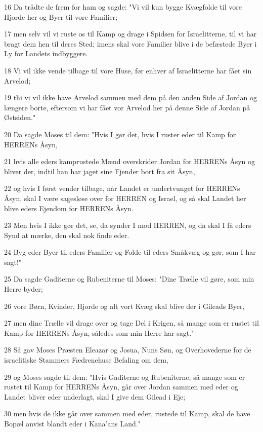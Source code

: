 \par 16 Da trådte de frem for ham og sagde: "Vi vil kun bygge Kvægfolde til vore Hjorde her og Byer til vore Familier;
\par 17 men selv vil vi ruste os til Kamp og drage i Spidsen for Israelitterne, til vi har bragt dem hen til deres Sted; imens skal vore Familier blive i de befæstede Byer i Ly for Landets indbyggere.
\par 18 Vi vil ikke vende tilbage til vore Huse, før enhver af Israelitterne har fået sin Arvelod;
\par 19 thi vi vil ikke have Arvelod sammen med dem på den anden Side af Jordan og længere borte, eftersom vi har fået vor Arvelod her på denne Side af Jordan på Østsiden."
\par 20 Da sagde Moses til dem: "Hvis I gør det, hvis I ruster eder til Kamp for HERRENs Åsyn,
\par 21 hvis alle eders kamprustede Mænd overskrider Jordan for HERRENs Åsyn og bliver der, indtil han har jaget sine Fjender bort fra sit Åsyn,
\par 22 og hvis I først vender tilbage, når Landet er undertvunget for HERRENs Åsyn, skal I være sagesløse over for HERREN og Israel, og så skal Landet her blive eders Ejendom for HERRENs Åsyn.
\par 23 Men hvis I ikke gør det, se, da synder I mod HERREN, og da skal I få eders Synd at mærke, den skal nok finde eder.
\par 24 Byg eder Byer til eders Familier og Folde til eders Småkvæg og gør, som I har sagt!"
\par 25 Da sagde Gaditerne og Rubeniterne til Moses: "Dine Trælle vil gøre, som min Herre byder;
\par 26 vore Børn, Kvinder, Hjorde og alt vort Kvæg skal blive der i Gileads Byer,
\par 27 men dine Trælle vil drage over og tage Del i Krigen, så mange som er rustet til Kamp for HERRENs Åsyn, således som min Herre har sagt."
\par 28 Så gav Moses Præsten Eleazar og Josua, Nuns Søn, og Overhovederne for de israelitiske Stammers Fædrenehuse Befaling om dem,
\par 29 og Moses sagde til dem: "Hvis Gaditerne og Rubeniterne, så mange som er rustet til Kamp for HERRENs Åsyn, går over Jordan sammen med eder og Landet bliver eder underlagt, skal I give dem Gilead i Eje;
\par 30 men hvis de ikke går over sammen med eder, rustede til Kamp, skal de have Bopæl anvist blandt eder i Kana'ans Land."
